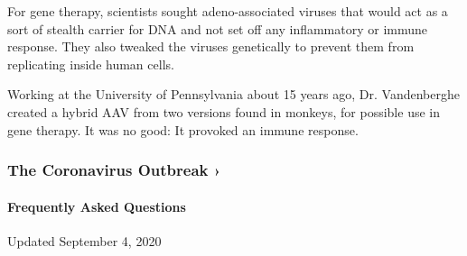 For gene therapy, scientists sought adeno-associated viruses that would
act as a sort of stealth carrier for DNA and not set off any
inflammatory or immune response. They also tweaked the viruses
genetically to prevent them from replicating inside human cells.

Working at the University of Pennsylvania about 15 years ago, Dr.
Vandenberghe created a hybrid AAV from two versions found in monkeys,
for possible use in gene therapy. It was no good: It provoked an immune
response.

\href{https://www.nytimes3xbfgragh.onion/news-event/coronavirus?action=click\&pgtype=Article\&state=default\&region=MAIN_CONTENT_3\&context=storylines_faq}{}

\hypertarget{the-coronavirus-outbreak-}{%
\subsubsection{The Coronavirus Outbreak
›}\label{the-coronavirus-outbreak-}}

\hypertarget{frequently-asked-questions}{%
\paragraph{Frequently Asked
Questions}\label{frequently-asked-questions}}

Updated September 4, 2020

